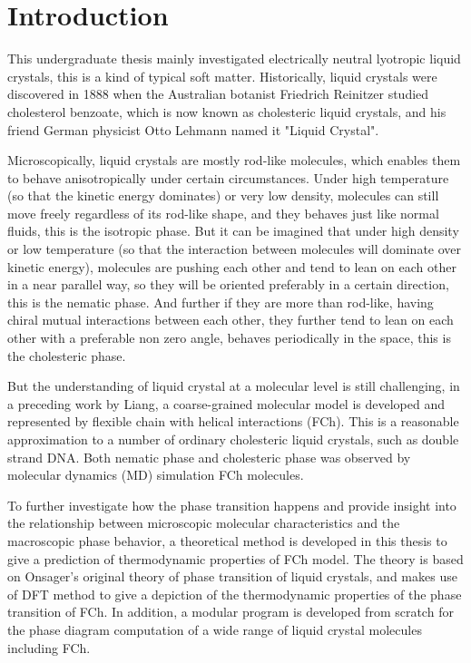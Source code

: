 
\chapter{Introduction}


This undergraduate thesis mainly investigated electrically neutral lyotropic liquid crystals, this is a kind of typical soft matter. Historically, liquid crystals were discovered in 1888 when the Australian botanist Friedrich Reinitzer studied cholesterol benzoate, which is now known as cholesteric liquid crystals, and his friend German physicist Otto Lehmann named it "Liquid Crystal".

Microscopically, liquid crystals are mostly rod-like molecules, which enables them to behave anisotropically under certain circumstances. Under high temperature (so that the kinetic energy dominates) or very low density, molecules can still move freely regardless of its rod-like shape, and they behaves just like normal fluids, this is the isotropic phase. But it can be imagined that under high density or low temperature (so that the interaction between molecules will dominate over kinetic energy), molecules are pushing each other and tend to lean on each other in a near parallel way, so they will be oriented preferably in a certain direction, this is the nematic phase. And further if they are more than rod-like, having chiral mutual interactions between each other, they further tend to lean on each other with a preferable non zero angle, behaves periodically in the space, this is the cholesteric phase.

But the understanding of liquid crystal at a molecular level is still challenging, in a preceding work by Liang\cite{Liang2017SM}, a coarse-grained molecular model is developed and represented by flexible chain with helical interactions (FCh). This is a reasonable approximation to a number of ordinary cholesteric liquid crystals, such as double strand DNA. Both nematic phase and cholesteric phase was observed by molecular dynamics (MD) simulation FCh molecules.

To further investigate how the phase transition happens and provide insight into the relationship between microscopic molecular characteristics and the macroscopic phase behavior, a theoretical method is developed in this thesis to give a prediction of thermodynamic properties of FCh model. The theory is based on Onsager's original theory\cite{Onsager1949NYAS} of phase transition of liquid crystals, and makes use of DFT method to give a depiction of the thermodynamic properties of the phase transition of FCh. In addition, a modular program is developed from scratch for the phase diagram computation of a wide range of liquid crystal molecules including FCh.

